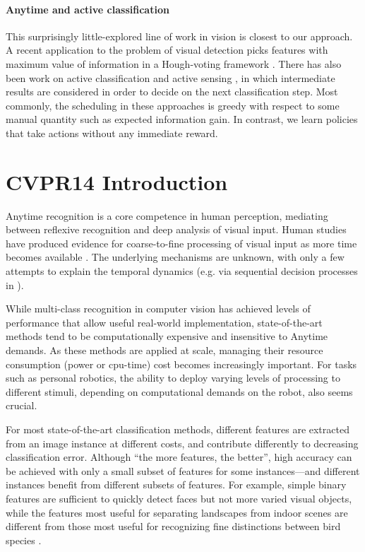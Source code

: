 \paragraph{Anytime and active classification}
This surprisingly little-explored line of work in vision is closest to our approach.
A recent application to the problem of visual detection picks features with maximum value of information in a Hough-voting framework \cite{Vijayanarasimhan2010}.
There has also been work on active classification \cite{Gao-NIPS-2011} and active sensing \cite{Yu2009}, in which intermediate results are considered in order to decide on the next classification step.
Most commonly, the scheduling in these approaches is greedy with respect to some manual quantity such as expected information gain.
In contrast, we learn policies that take actions without any immediate reward.

\section{CVPR14 Introduction}

Anytime recognition is a core competence in human perception, mediating between reflexive recognition and deep analysis of visual input.
Human studies have produced evidence for coarse-to-fine processing of visual input as more time becomes available \parencite{Vanrullen-1996,Fei-Fei-Vision-2007,Mace-PloS-2009}.
The underlying mechanisms are unknown, with only a few attempts to explain the temporal dynamics (e.g. via sequential decision processes in \textcite{Hegde-Neuro-2008}).

While multi-class recognition in computer vision has achieved levels of performance that allow useful real-world implementation, state-of-the-art methods tend to be computationally expensive and insensitive to Anytime demands.
As these methods are applied at scale, managing their resource consumption (power or cpu-time) cost becomes increasingly important.
For tasks such as personal robotics, the ability to deploy varying levels of processing to different stimuli, depending on computational demands on the robot, also seems crucial.

For most state-of-the-art classification methods, different features are extracted from an image instance at different costs, and contribute differently to decreasing classification error.
Although ``the more features, the better'', high accuracy can be achieved with only a small subset of features for some instances---and different instances benefit from different subsets of features.
For example, simple binary features are sufficient to quickly detect faces \parencite{Viola2004} but not more varied visual objects, while the features most useful for separating landscapes from indoor scenes \parencite{Xiao-CVPR-2010} are different from those most useful for recognizing fine distinctions between bird species \parencite{Farrell-ICCV-2011}.

